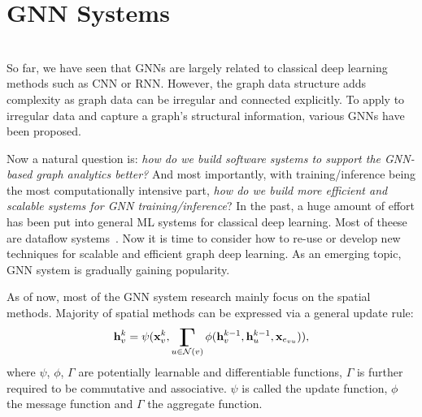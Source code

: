\section{GNN Systems} \hfill \\
\label{sec:gnnsys}
So far, we have seen that GNNs are largely related to classical deep learning methods such as CNN or RNN. However, the graph data structure adds complexity as graph data can be irregular and connected explicitly. To apply to irregular data and capture a graph's structural information, various GNNs have been proposed. 

Now a natural question is: \textit{how do we build software systems to support the GNN-based graph analytics better?} And most importantly, with training/inference being the most computationally intensive part, \textit{how do we build more efficient and scalable systems for GNN training/inference}? In the past, a huge amount of effort has been put into general ML systems for classical deep learning. Most of theese are dataflow systems~\cite{spark, tf, torch}. Now it is time to consider how to re-use or develop new techniques for scalable and efficient graph deep learning. As an emerging topic, GNN system is gradually gaining popularity. 

As of now, most of the GNN system research mainly focus on the spatial methods. Majority of spatial methods can be expressed via a general update rule:
\begin{gather}
\label{eq:mp}
\mathbf{h}_v ^k = \psi ( \mathbf{x}_v^k, \gammasum_{u \in {\mathcal {N}}(v)}  \phi(\mathbf{h}_v^{k-1}, \mathbf{h}_u^{k-1}, \mathbf{x}_{e_{vu}})),
\end{gather} 
where $\psi$, $\phi$, $\Gamma$ are potentially learnable and differentiable functions, $\Gamma$ is further required to be commutative and associative. $\psi$ is called the update function, $\phi$ the message function and $\Gamma$ the aggregate function.



